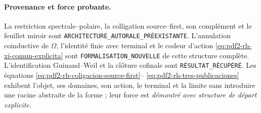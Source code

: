 \paragraph{Provenance et force probante.}
La restriction spectrale--polaire, la colligation source--first, son complément et
le feuillet miroir sont \texttt{ARCHITECTURE\_AUTORALE\_PRÉEXISTANTE}.
L'annulation coinductive de \(\Omega\), l'identité finie avec terminal et le
codeur d'action
\eqref{eq:pdf2-rh-xi-comun-explicita} sont
\texttt{FORMALISATION\_NOUVELLE} de cette structure complète. L'identification
Guinand--Weil et la clôture cofinale sont \texttt{RÉSULTAT\_RÉCUPÉRÉ}. Les
équations
\eqref{eq:pdf2-rh-coligacion-source-first}--
\eqref{eq:pdf2-rh-tres-publicaciones} exhibent l'objet, ses domaines, son
action, le terminal et la limite sans introduire une racine abstraite de la forme ;
leur force est \emph{démontré avec structure de départ explicite}.
